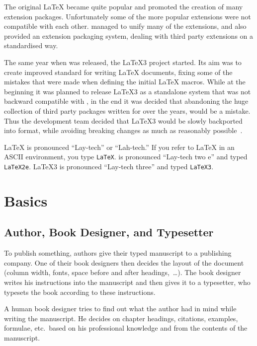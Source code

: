 The original \LaTeX{} became quite popular and promoted the creation of many
extension packages. Unfortunately some of the more popular extensions were not
compatible with each other. \LaTeXe{} managed to unify many of the extensions,
and also provided an extension packaging system, dealing with third party
extensions on a standardised way.

The same year when \LaTeXe{} was released, the \LaTeX3 project started. Its aim
was to create improved standard for writing \LaTeX{} documents, fixing some of
the mistakes that were made when defining the initial \LaTeX{} macros. While at
the beginning it was planned to release \LaTeX3 as a standalone system that was
not backward compatible with \LaTeXe{}, in the end it was decided that
abandoning the huge collection of third party packages written for \LaTeXe{}
over the years, would be a mistake. Thus the development team decided that
\LaTeX3 would be slowly backported into \LaTeXe{} format, while avoiding
breaking changes as much as reasonably possible~\cite{quovadis}.

\LaTeX{} is pronounced \enquote{Lay-tech} or \enquote{Lah-tech.} If you refer
to \LaTeX{} in an ASCII environment, you type \texttt{LaTeX}. \LaTeXe{} is
pronounced \enquote{Lay-tech two e} and typed \texttt{LaTeX2e}. \LaTeX3 is
pronounced \enquote{Lay-tech three} and typed \texttt{LaTeX3}.

\section{Basics}

\subsection{Author, Book Designer, and Typesetter}

To publish something, authors give their typed manuscript to a
publishing company. One of their book designers then
decides the layout of the document (column width, fonts, space before
and after headings,~\ldots). The book designer writes his instructions
into the manuscript and then gives it to a typesetter, who typesets the
book according to these instructions.

A human book designer tries to find out what the author had in mind
while writing the manuscript. He decides on chapter headings,
citations, examples, formulae, etc.\ based on his professional
knowledge and from the contents of the manuscript.

